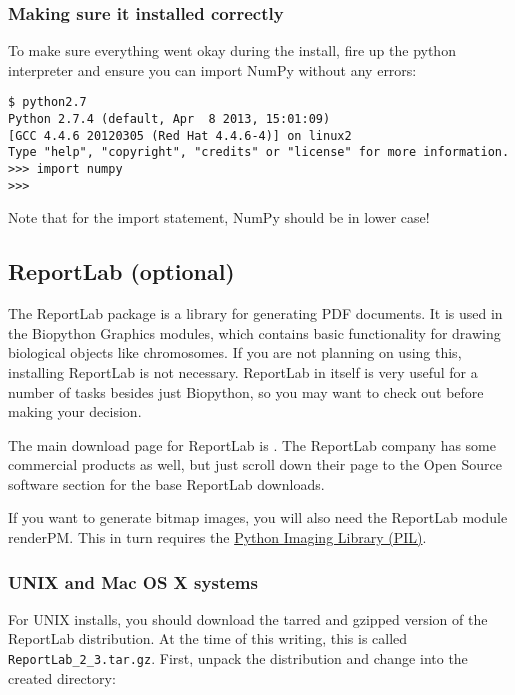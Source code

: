 \documentclass{article}
\begin{document}
\subsubsection{Making sure it installed correctly}

To make sure everything went okay during the install, fire up the python
interpreter and ensure you can import NumPy without any errors:

\begin{verbatim}
$ python2.7
Python 2.7.4 (default, Apr  8 2013, 15:01:09) 
[GCC 4.4.6 20120305 (Red Hat 4.4.6-4)] on linux2
Type "help", "copyright", "credits" or "license" for more information.
>>> import numpy
>>>
\end{verbatim}

Note that for the import statement, NumPy should be in lower case!

\subsection{ReportLab (optional)}

The ReportLab package is a library for generating PDF documents. It is
used in the Biopython Graphics modules, which contains basic
functionality for drawing biological objects like chromosomes. If you
are not planning on using this, installing ReportLab is not necessary.
ReportLab in itself is very useful for a number of tasks besides just
Biopython, so you may want to check out
 before making your decision.

The main download page for ReportLab is
. The ReportLab
company has some commercial products as well, but just scroll down their
page to the Open Source software section for the base ReportLab
downloads.

If you want to generate bitmap images, you will also need the ReportLab
module renderPM.  This in turn requires the
\href{http://www.pythonware.com/products/pil/}{Python Imaging Library (PIL)}.

\subsubsection{UNIX and Mac OS X systems}

For UNIX installs, you should download the tarred and gzipped version of
the ReportLab distribution. At the time of this writing, this is called
\verb|ReportLab_2_3.tar.gz|. First, unpack the distribution and change
into the created directory:
\end{document}
